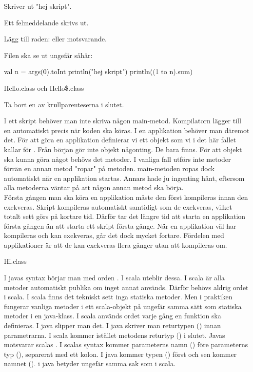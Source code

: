 \Task 

\Subtask Skriver ut "hej skript".

\Subtask Ett felmeddelande skrivs ut.

\Subtask Lägg till raden:
eller motsvarande.

\Subtask Filen ska se ut ungefär såhär: \\
\begin{Code} 
val n = args(0).toInt 
println("hej skript") 
println((1 to n).sum)
\end{Code}

\Subtask {}

\Task 

\Subtask Hello.class och Hello\$.class

\Subtask Ta bort en av krullparenteserna i slutet.

\Subtask I ett skript behöver man inte skriva någon main-metod. Kompilatorn lägger till en automatiskt precis när koden ska köras. I en applikation behöver man däremot det. För att göra en applikation definierar vi ett objekt som vi i det här fallet kallar för . Från början gör inte objekt någonting. De bara finns. För att objekt ska kunna göra något behövs det metoder. I vanliga fall utförs inte metoder förrän en annan metod "ropar" på metoden. main-metoden ropas dock automatiskt när en applikation startas. Annars hade ju ingenting hänt, eftersom alla metoderna väntar på att någon annan metod ska börja. \\
\Subtask Första gången man ska köra en applikation måste den först kompileras innan den exekveras. Skript kompileras automatiskt samtidigt som de exekveras, vilket totalt sett görs på kortare tid. Därför tar det längre tid att starta en applikation första gången än att starta ett skript första gånge. När en applikation väl har kompileras och kan exekveras, går det dock mycket fortare. Fördelen med applikationer är att de kan exekveras flera gånger utan att kompileras om.

\Task 

\Subtask Hi.class

\Subtask I javas syntax börjar man med orden . I scala uteblir dessa. I scala är alla metoder automatiskt publika om inget annat används. Därför behövs aldrig ordet  i scala. I scala finns det tekniskt sett inga statiska metoder. Men i praktiken fungerar vanliga metoder i ett scala-objekt på ungefär samma sätt som statiska metoder i en java-klass. I scala används ordet  varje gång en funktion ska definieras. I java slipper man det. I java skriver man returtypen () innan parametrarna. I scala kommer istället metodens returtyp () i slutet. Javas  motsvarar scalas . I scalas syntax kommer parameterns namn () före parameterns typ (), separerat med ett kolon. I java kommer typen () först och sen kommer namnet ().  i java betyder ungefär samma sak som  i scala.

